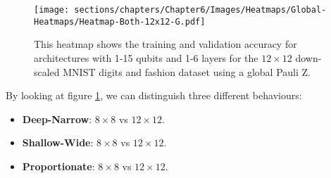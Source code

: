\begin{figure}[h]
    \centering
    \texttt{[image: sections/chapters/Chapter6/Images/Heatmaps/Global-Heatmaps/Heatmap-Both-12x12-G.pdf]}
    \caption{This heatmap shows the training and validation accuracy for architectures with 1-15 qubits and
    1-6 layers for the $12\times12$ down-scaled MNIST digits and fashion dataset using a global Pauli Z.}
    \label{fig:heatmap-12x12-G}
\end{figure}

By looking at figure \ref{fig:heatmap-12x12-G}, we can distinguish 
three different behaviours:

\begin{itemize}
    \item \textbf{Deep-Narrow}: $8 \times 8$ vs $12 \times 12$.\\
    
    \item \textbf{Shallow-Wide}: $8 \times 8$ vs $12 \times 12$.\\
    
    \item \textbf{Proportionate}: $8 \times 8$ vs $12 \times 12$.\\
    
 \end{itemize}